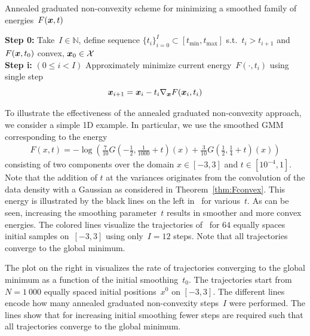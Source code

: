 \documentclass{article} %
\theoremstyle{plain}
\theoremstyle{definition}
\theoremstyle{remark}
\newcommand{\N}{\mathbb{N}}
\newcommand{\X}{\mathcal{X}}
\newcommand{\tmin}{t_\mathrm{min}}
\newcommand{\tmax}{t_\mathrm{max}}
\begin{document}
\begin{algorithm}[t]
\caption{Annealed graduated non-convexity scheme for minimizing a smoothed family of energies~$F({\bm{x}},t)$}\label{alg:graduatedNC}
\textbf{Step 0:} Take~$I\in\N$, define sequence $\{t_i\}_{i=0}^I\subset[\tmin,\tmax]$ s.t.~$t_{i}>t_{i+1}$ and~$F({\bm{x}},t_0)$ convex, $\vx_0\in\X$ \\
\textbf{Step i:} $(0\leq i< I)$ 
Approximately minimize current energy~$F(\cdot,t_i)$ using single step
\[
{\bm{x}}_{i+1}={\bm{x}}_i-t_i \nabla_{\bm{x}} F({\bm{x}}_i,t_i)
\] 
\end{algorithm}

To illustrate the effectiveness of the annealed graduated non-convexity approach, we consider a simple 1D example.
In particular, we use the smoothed GMM corresponding to the energy
\begin{align} \label{eq:gmmEx}
F(x,t)=-\log\left(\tfrac{7}{10}G\left(-\tfrac12,\tfrac{1}{1000}+t\right)(x)+\tfrac{3}{10}G\left(\tfrac12,\tfrac14+t\right)(x)\right)
\end{align}
consisting of two components over the domain $x\in[-3,3]$ and $t\in[10^{-4},1]$.
Note that the addition of $t$ at the variances originates from the convolution of the data density with a Gaussian as considered in Theorem~\ref{thm:Fconvex}.
This energy is illustrated by the black lines on the left in~ for various~$t$.
As can be seen, increasing the smoothing parameter~$t$ results in smoother and more convex energies.
The colored lines visualize the trajectories of~ for $64$ equally spaces initial samples on~$[-3,3]$ using only~$I=12$ steps.
Note that all trajectories converge to the global minimum.

The plot on the right in  visualizes the rate of trajectories converging to the global minimum as a function of the initial smoothing~$t_0$.
The trajectories start from~$N=1\ 000$ equally spaced initial positions~$x^0$ on $[-3,3]$.
The different lines encode how many annealed graduated non-convexity steps~$I$ were performed.
The lines show that for increasing initial smoothing fewer steps are required such that all trajectories converge to the global minimum.
\end{document}
